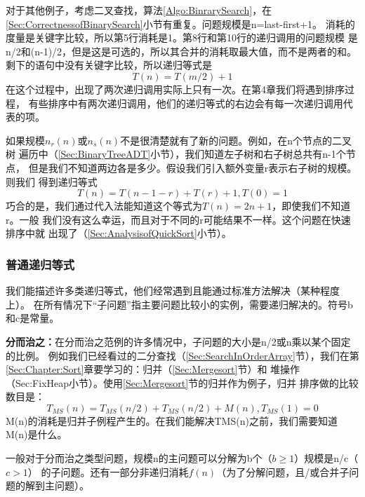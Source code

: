 \begin{example}
对于其他例子，考虑二叉查找，算法\ref{Algo:BinrarySearch}，在
\ref{Sec:CorrectnessofBinarySearch}小节有重复。问题规模是n=last-first+1。
消耗的度量是关键字比较，所以第5行消耗是1。第8行和第10行的递归调用的问题规模
是n/2和(n-1)/2，但是这是可选的，所以其合并的消耗取最大值，而不是两者的和。
剩下的语句中没有关键字比较，所以递归等式是
\begin{displaymath}
T(n)=T(m/2)+1
\end{displaymath}
在这个过程中，出现了两次递归调用实际上只有一次。在第4章我们将遇到排序过程，
有些排序中有两次递归调用，他们的递归等式的右边会有每一次递归调用代表的项。
\end{example}

如果规模$n_r(n)$或$n_s(n)$不是很清楚就有了新的问题。例如，在n个节点的二叉树
遍历中（\ref{Sec:BinaryTreeADT}小节），我们知道左子树和右子树总共有n-1个节点，
但是我们不知道两边各是多少。假设我们引入额外变量r表示右子树的规模。则我们
得到递归等式
\begin{displaymath}
T(n)=T(n-1-r)+T(r)+1, T(0)=1
\end{displaymath}
巧合的是，我们通过代入法能知道这个等式为$T(n)=2n+1$，即使我们不知道r。一般
我们没有这么幸运，而且对于不同的r可能结果不一样。这个问题在快速排序中就
出现了（\ref{Sec:AnalysisofQuickSort}小节）。


\subsubsection{普通递归等式}
我们能描述许多类递归等式，他们经常遇到且能通过标准方法解决（某种程度上）。
在所有情况下“子问题”指主要问题比较小的实例，需要递归解决的。符号b和c是常量。

\noindent
{\textbf{分而治之：}}在分而治之范例的许多情况中，子问题的大小是n/2或n乘以某个固定的比例。
例如我们已经看过的二分查找（\ref{Sec:SearchInOrderArray}节），我们在第
\ref{Sec:Chapter:Sort}章要学习的：归并（\ref{Sec:Mergesort}节）和
堆操作（{Sec:FixHeap}小节）。使用\ref{Sec:Mergesort}节的归并作为例子，归并
排序做的比较数目是：
\begin{equation}\label{Equ:3_2}
T_{MS}(n)=T_{MS}(n/2)+T_{MS}(n/2)+M(n), T_{MS}(1)=0
\end{equation}
M(n)的消耗是归并子例程产生的。在我们能解决TMS(n)之前，我们需要知道M(n)是什么。

一般对于分而治之类型问题，规模n的主问题可以分解为b个（$b \geq 1$）规模是n/c（$c>1$）
的子问题。还有一部分非递归消耗$f(n)$（为了分解问题，且/或合并子问题的解到主问题）。


